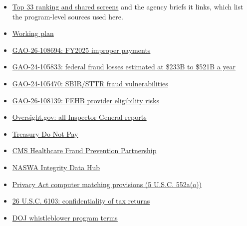 \documentclass[letterpaper,11pt]{article}
\providecommand{\tightlist}{\setlength{\itemsep}{0pt}\setlength{\parskip}{0pt}}
\begin{document}
\begin{itemize}
\tightlist
\item
  \href{agencies/top33.pdf}{Top 33 ranking and shared screens} and the
  agency briefs it links, which list the program-level sources used
  here.
\item
  \href{plan.pdf}{Working plan}
\item
  \href{https://www.gao.gov/products/gao-26-108694}{GAO-26-108694:
  FY2025 improper payments}
\item
  \href{https://www.gao.gov/products/GAO-24-105833}{GAO-24-105833:
  federal fraud losses estimated at \$233B to \$521B a year}
\item
  \href{https://www.gao.gov/products/GAO-24-105470}{GAO-24-105470:
  SBIR/STTR fraud vulnerabilities}
\item
  \href{https://files.gao.gov/reports/GAO-26-108139/index.html}{GAO-26-108139:
  FEHB provider eligibility risks}
\item
  \href{https://www.oversight.gov/}{Oversight.gov: all Inspector General
  reports}
\item
  \href{https://fiscal.treasury.gov/dnp/}{Treasury Do Not Pay}
\item
  \href{https://www.cms.gov/medicare/medicaid-coordination/healthcare-fraud-prevention-partnership}{CMS
  Healthcare Fraud Prevention Partnership}
\item
  \href{https://www.naswa.org/integrity-center/integrity-data-hub}{NASWA
  Integrity Data Hub}
\item
  \href{https://www.law.cornell.edu/uscode/text/5/552a}{Privacy Act
  computer matching provisions (5 U.S.C. 552a(o))}
\item
  \href{https://www.law.cornell.edu/uscode/text/26/6103}{26 U.S.C. 6103:
  confidentiality of tax returns}
\item
  \href{https://www.justice.gov/fraud/whistleblower}{DOJ whistleblower
  program terms}
\end{itemize}
\end{document}
